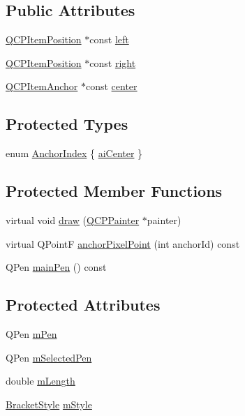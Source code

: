 \subsection*{Public Attributes}
\begin{DoxyCompactItemize}
\item 
\hyperlink{class_q_c_p_item_position}{Q\+C\+P\+Item\+Position} $\ast$const \hyperlink{class_q_c_p_item_bracket_af6cc6d27d96171778c6927d6edce48b0}{left}
\item 
\hyperlink{class_q_c_p_item_position}{Q\+C\+P\+Item\+Position} $\ast$const \hyperlink{class_q_c_p_item_bracket_afa6c1360b05a50c4e0df37b3cebab6be}{right}
\item 
\hyperlink{class_q_c_p_item_anchor}{Q\+C\+P\+Item\+Anchor} $\ast$const \hyperlink{class_q_c_p_item_bracket_a2dbcabdf5f467f28be12a7b25962ffca}{center}
\end{DoxyCompactItemize}
\subsection*{Protected Types}
\begin{DoxyCompactItemize}
\item 
enum \hyperlink{class_q_c_p_item_bracket_a7f3a6a56d67f71219ed220553f3dd861}{Anchor\+Index} \{ \hyperlink{class_q_c_p_item_bracket_a7f3a6a56d67f71219ed220553f3dd861a17b57ef34cc05eadfe9becd1ad5b5242}{ai\+Center}
 \}
\end{DoxyCompactItemize}
\subsection*{Protected Member Functions}
\begin{DoxyCompactItemize}
\item 
virtual void \hyperlink{class_q_c_p_item_bracket_a8343cf0559c64886add7aa7f4b22f1a6}{draw} (\hyperlink{class_q_c_p_painter}{Q\+C\+P\+Painter} $\ast$painter)
\item 
virtual Q\+Point\+F \hyperlink{class_q_c_p_item_bracket_ac76827e3acba5faee81f149af4047a39}{anchor\+Pixel\+Point} (int anchor\+Id) const 
\item 
Q\+Pen \hyperlink{class_q_c_p_item_bracket_a8df4ad873bf88a4a7bfb9bbbd490e495}{main\+Pen} () const 
\end{DoxyCompactItemize}
\subsection*{Protected Attributes}
\begin{DoxyCompactItemize}
\item 
Q\+Pen \hyperlink{class_q_c_p_item_bracket_a350c864a5853b04343719f5a8be6b675}{m\+Pen}
\item 
Q\+Pen \hyperlink{class_q_c_p_item_bracket_adcfb53602d1802d00e2de4fd6df6b291}{m\+Selected\+Pen}
\item 
double \hyperlink{class_q_c_p_item_bracket_ab3d99bba8da18eb4d0e0cb23dded33b2}{m\+Length}
\item 
\hyperlink{class_q_c_p_item_bracket_a7ac3afd0b24a607054e7212047d59dbd}{Bracket\+Style} \hyperlink{class_q_c_p_item_bracket_ac911907184c824d621f274f8e0990080}{m\+Style}
\end{DoxyCompactItemize}
